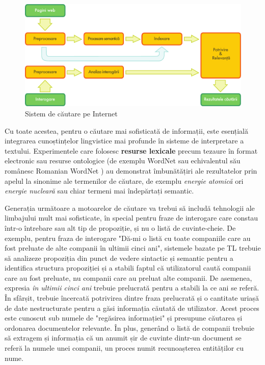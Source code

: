 \documentclass[]{../../metanetpaper}
\begin{document}
\begin{multicols}{2}
\begin{figure}[htb]
\center
\includegraphics[width=\textwidth]{../_media/romanian/web_search_architecture}
\caption{Sistem de căutare pe Internet}
\label{fig:websearcharch_de}
\end{figure}

Cu toate acestea, pentru o căutare mai sofisticată de informații, este esențială integrarea cunoștințelor lingvistice mai profunde în sisteme de interpretare a textului. Experimentele care folosesc \textbf{resurse lexicale} precum tezaure în format electronic sau resurse ontologice (de exemplu WordNet sau echivalentul său românesc Romanian WordNet\cite{WN} ) au demonstrat îmbunătățiri ale rezultatelor prin apelul la sinonime ale termenilor de căutare, de exemplu \textit{energie atomică} ori \textit{energie nucleară} sau chiar termeni mai îndepărtați semantic.


Generația următoare a motoarelor de căutare va trebui să includă tehnologii ale limbajului mult mai sofisticate, în special pentru fraze de interogare care constau într-o întrebare sau alt tip de propoziție, și nu o listă de cuvinte-cheie. De exemplu, pentru fraza de interogare "Dă-mi o listă cu toate companiile care au fost preluate de alte companii în ultimii cinci ani", sistemele bazate pe TL trebuie să analizeze propoziția din punct de vedere sintactic și semantic pentru a identifica structura propoziției și a stabili faptul că utilizatorul caută companii care au fost preluate, nu companii care au preluat alte companii. De asemenea, expresia \textit{în ultimii cinci ani} trebuie prelucrată pentru a stabili la ce ani se referă. În sfârșit, trebuie încercată potrivirea dintre fraza prelucrată și o cantitate uriașă de date nestructurate pentru a găsi informația căutată de utilizator. Acest proces este cunoscut sub numele de "regăsirea informației" și presupune căutarea și ordonarea documentelor relevante. În plus, generând o listă de companii trebuie să extragem și informația că un anumit șir de cuvinte dintr-un document se referă la numele unei companii, un proces numit recunoașterea entităților cu nume.


\end{multicols}
\end{document}

